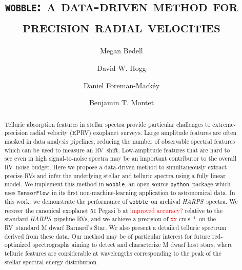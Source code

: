 \documentclass[twocolumn]{aastex62}
\newcommand{\unit}[1]{\mathrm{#1}}
\newcommand{\cm}{\unit{cm}}
\newcommand{\s}{\unit{s}}
\newcommand{\cms}{$\cm\,\s^{-1}$}
\newcommand{\todo}[1]{\textcolor{red}{#1}}  %
\newcommand{\acronym}[1]{{\small{#1}}}
\newcommand{\project}[1]{\textsl{#1}}
\newcommand{\code}[1]{\texttt{#1}}
\newcommand{\HARPS}{\project{\acronym{HARPS}}}
\newcommand{\RV}{\acronym{RV}}
\newcommand{\EPRV}{\acronym{EPRV}}
\newcommand{\wobble}{\code{wobble}}
\newcommand{\TF}{\code{TensorFlow}}
\newcommand{\python}{\code{python}}
\newcommand{\Mdwarf}{Barnard's Star}
\begin{document}
\graphicspath{ {../figures/} }

\title{\textsc{\wobble: a data-driven method for precision radial velocities}}

\author[0000-0001-9907-7742]{Megan Bedell}

\author[0000-0003-2866-9403]{David W. Hogg}

\author{Daniel Foreman-Mack\'{e}y}

\author{Benjamin T. Montet}


\begin{abstract}
Telluric absorption features in stellar spectra provide particular challenges to extreme-precision radial velocity (\EPRV) exoplanet surveys. 
Large amplitude features are often masked in data analysis pipelines, reducing the number of observable spectral features which can be used to measure an \RV\ shift.
Low-amplitude features that are hard to see even in high signal-to-noise spectra may be an important contributor to the overall \RV\ noise budget.
Here we propose a data-driven method to simultaneously extract precise \RV s and infer the underlying stellar and telluric spectra using a fully linear model. 
We implement this method in \wobble, an open-source \python\ package which uses \TF\ in its first non-machine-learning application to astronomical data. 
In this work, we demonstrate the performance of \wobble\ on archival \HARPS\ spectra.
We recover the canonical exoplanet 51 Pegasi b at \todo{improved accuracy?} relative to the standard \HARPS\ pipeline \RV s, and we achieve a precision of \todo{xx} \cms\ on the \RV\ standard M dwarf \Mdwarf. 
We also present a detailed telluric spectrum derived from these data. 
Our method may be of particular interest for future red-optimized spectrographs aiming to detect and characterize M dwarf host stars, where telluric features are considerable at wavelengths corresponding to the peak of the stellar spectral energy distribution.  \end{abstract}
\end{document}
